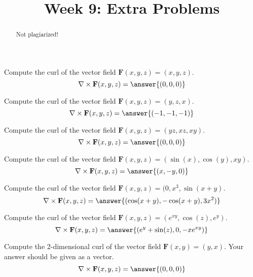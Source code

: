 \documentclass{ximera}
\title{Week 9: Extra Problems}
\begin{document}
  
\begin{abstract}  
Not plagiarized!
\end{abstract}  
\maketitle 


\begin{problem}
Compute the curl of the vector field $\mathbf{F}(x,y,z) = (x,y,z)$.
\[
\nabla\times\mathbf{F}(x,y,z) = \answer{(0,0,0)}
\]
\end{problem}

\begin{problem}
Compute the curl of the vector field $\mathbf{F}(x,y,z) = (y,z,x)$.
\[
\nabla\times\mathbf{F}(x,y,z) = \answer{(-1,-1,-1)}
\]
\end{problem}

\begin{problem}
Compute the curl of the vector field $\mathbf{F}(x,y,z) = (yz,xz,xy)$.
\[
\nabla\times\mathbf{F}(x,y,z) = \answer{(0,0,0)}
\]
\end{problem}

\begin{problem}
Compute the curl of the vector field $\mathbf{F}(x,y,z) = (\sin(x),\cos(y),xy)$.
\[
\nabla\times\mathbf{F}(x,y,z) = \answer{(x,-y,0)}
\]
\end{problem}

\begin{problem}
Compute the curl of the vector field $\mathbf{F}(x,y,z) = (0,x^3,\sin(x+y)$.
\[
\nabla\times\mathbf{F}(x,y,z) = \answer{(\cos(x+y),-\cos(x+y),3x^2)}
\]
\end{problem}

\begin{problem}
Compute the curl of the vector field $\mathbf{F}(x,y,z) = (e^{xy},\cos(z),e^{y})$.
\[
\nabla\times\mathbf{F}(x,y,z) = \answer{(e^y+\sin(z),0,-xe^{xy})}
\]
\end{problem}


\begin{problem}
Compute the 2-dimensional curl of the vector field $\mathbf{F}(x,y) = (y,x)$. Your answer should be given as a vector.
\[
\nabla\times\mathbf{F}(x,y,z) = \answer{(0,0,0)}
\]
\end{problem}
\end{document}
